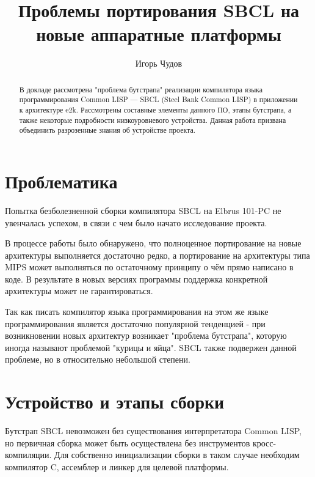 \author{Игорь Чудов}
\title{Проблемы портирования SBCL на новые аппаратные платформы}
\maketitle

\begin{abstract}
  В докладе рассмотрена "проблема бутстрапа" реализации компилятора
  языка программирования Common LISP --- SBCL (Steel Bank Common LISP)
  в приложении к архитектуре e2k. Рассмотрены составные элементы данного
  ПО, этапы бутстрапа, а также некоторые подробности низкоуровневого
  устройства. Данная работа призвана объединить разрозенные знания об
  устройстве проекта.
\end{abstract}

\section{Проблематика}

Попытка безболезненной сборки компилятора SBCL на Elbrus 101-PC не
увенчалась успехом, в связи с чем было начато исследование проекта.

В процессе работы было обнаружено, что полноценное портирование на новые
архитектуры выполняется достаточно редко, а портирование на архитектуры
типа MIPS может выполняться по остаточному принципу о чём прямо написано
в коде. В результате в новых версиях программы поддержка конкретной
архитектуры может не гарантироваться.

Так как писать компилятор языка программирования на этом же языке
программирования является достаточно популярной тенденцией - при
возникновении новых архитектур возникает "проблема бутстрапа", которую
иногда называют проблемой "курицы и яйца". SBCL также подвержен данной
проблеме, но в относительно небольшой степени.

\section{Устройство и этапы сборки}

Бутстрап SBCL невозможен без существования интерпретатора Common LISP,
но первичная сборка может быть осуществлена без инструментов
кросс-компиляции. Для собственно инициализации сборки в таком случае
необходим компилятор C, ассемблер и линкер для целевой платформы.

